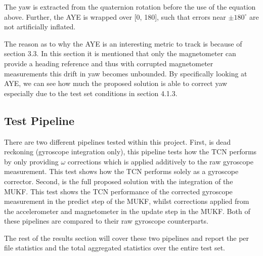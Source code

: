 The yaw is extracted from the quaternion rotation before the use of the equation above. Further, the AYE is wrapped over [0, 180], such that errors near $\pm180^{\circ}$ are not artificially inflated.

The reason as to why the AYE is an interesting metric to track is because of section 3.3. In this section it is mentioned that only the magnetometer can provide
a heading reference and thus with corrupted magnetometer measurements this drift in yaw becomes unbounded. By specifically looking at AYE, we can see how much the proposed solution is
able to correct yaw especially due to the test set conditions in section 4.1.3. 

\subsection{Test Pipeline}

There are two different pipelines tested within this project. First, is dead reckoning (gyroscope integration only), this pipeline tests how the TCN performs by only providing $\omega$ corrections
which is applied additively to the raw gyroscope measurement. This test shows how the TCN performs solely as a gyroscope corrector. Second, is the full proposed solution with the integration of 
the MUKF. This test shows the TCN performance of the corrected gyroscope measurement in the predict step of the MUKF, whilst corrections applied from the accelerometer and magnetometer in the update step in the MUKF. Both of
these pipelines are compared to their raw gyroscope counterparts. 

The rest of the results section will cover these two pipelines and report the per file statistics and the total aggregated statistics over the entire test set. 





